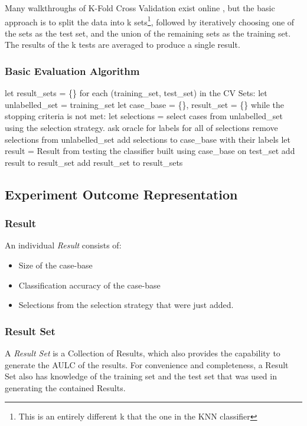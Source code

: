 \documentclass[a4paper,11pt]{report}
\begin{document}
Many walkthroughs of K-Fold Cross Validation exist online \citep{web:kfolddemo}, but the basic approach is to split the data into k sets\footnote{This is an entirely different k that the one in the KNN classifier}, followed by iteratively choosing one of the sets as the test set, and the union of the remaining sets as the training set. The results of the k tests are averaged to produce a single result.

\subsubsection{Basic Evaluation Algorithm}
\nopagebreak[4]
\begin{code}
let result_sets = \{\}
for each (training_set, test_set) in the CV Sets:
  let unlabelled_set = training_set
  let case_base = \{\}, result_set = \{\}
  while the stopping criteria is not met:
    let selections = select cases from unlabelled_set using 
                     the selection strategy.
    ask oracle for labels for all of selections
    remove selections from unlabelled_set
    add selections to case_base with their labels
    let result = Result from testing the classifier
                 built using case_base on test_set
    add result to result_set
  add result_set to result_sets
\end{code}

\subsection{Experiment Outcome Representation}
\subsubsection{Result}
An individual \emph{Result} consists of:
\begin{itemize}
	\item Size of the case-base
	\item Classification accuracy of the case-base
	\item Selections from the selection strategy that were just added.
\end{itemize}

\subsubsection{Result Set}
A \emph{Result Set} is a Collection of Results, which also provides the capability to generate the AULC of the results. For convenience and completeness, a Result Set also has knowledge of the training set and the test set that was used in generating the contained Results.
\end{document}
